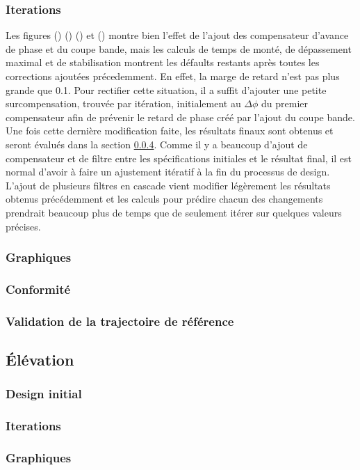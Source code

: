 \documentclass{udes_rapport} %
\begin{document}
\subsubsection{Iterations}
Les figures () () () et () montre bien l'effet de l'ajout des compensateur d'avance de phase et du coupe bande, mais les calculs de temps de monté, de dépassement maximal et de stabilisation montrent les défaults restants après toutes les corrections ajoutées précedemment. En effet, la marge de retard n'est pas plus grande que 0.1. Pour rectifier cette situation, il a suffit d'ajouter une petite surcompensation, trouvée par itération, initialement au $\Delta \phi$ du premier compensateur afin de prévenir le retard de phase créé par l'ajout du coupe bande. Une fois cette dernière modification faite, les résultats finaux sont obtenus et seront évalués dans la section \ref{valid_AZ_A}. Comme il y a beaucoup d'ajout de compensateur et de filtre entre les spécifications initiales et le résultat final, il est normal d'avoir à faire un ajustement itératif à la fin du processus de design. L'ajout de plusieurs filtres en cascade vient modifier légèrement les résultats obtenus précédemment et les calculs pour prédire chacun des changements prendrait beaucoup plus de temps que de seulement itérer sur quelques valeurs précises.
\subsubsection{Graphiques}
\subsubsection{Conformité}
\subsubsection{Validation de la trajectoire de référence} \label{valid_AZ_A}
\subsection{Élévation}
\subsubsection{Design initial}
\subsubsection{Iterations}
\subsubsection{Graphiques}
\end{document}
